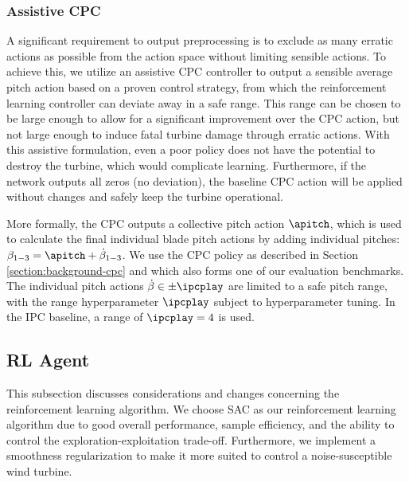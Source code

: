 \subsubsection{Assistive CPC}

A significant requirement to output preprocessing is to exclude as many erratic actions as possible from the action space without limiting sensible actions. To achieve this, we utilize an assistive CPC controller to output a sensible average pitch action based on a proven control strategy, from which the reinforcement learning controller can deviate away in a safe range. This range can be chosen to be large enough to allow for a significant improvement over the CPC action, but not large enough to induce fatal turbine damage through erratic actions. With this assistive formulation, even a poor policy does not have the potential to destroy the turbine, which would complicate learning. Furthermore, if the network outputs all zeros (no deviation), the baseline CPC action will be applied without changes and safely keep the turbine operational.

More formally, the CPC outputs a collective pitch action $\apitch$, which is used to calculate the final individual blade pitch actions by adding individual pitches: $\apitchx_{1-3} = \apitch + \apitchxd_{1-3}$. We use the \ac{CPC} policy as described in Section \ref{section:background-cpc} and which also forms one of our evaluation benchmarks. The individual pitch actions $\apitchxd \in \pm \ipcplay$ are limited to a safe pitch range, with the range hyperparameter $\ipcplay$ subject to hyperparameter tuning. In the IPC baseline, a range of $\ipcplay=4$ is used.


\subsection{RL Agent}
\label{section:approach-rl-algorithm}

\begin{summary}
This subsection discusses considerations and changes concerning the reinforcement learning algorithm. We choose \ac{SAC} \cite{haarnojaSoftActorCriticOffPolicy2018} as our reinforcement learning algorithm due to good overall performance, sample efficiency, and the ability to control the exploration-exploitation trade-off. Furthermore, we implement a smoothness regularization to make it more suited to control a noise-susceptible wind turbine.
\end{summary}

